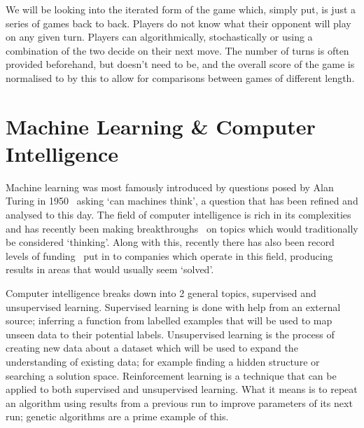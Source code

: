 We will be looking into the iterated form of the game which, simply put, is just a series of games back to back. 
Players do not know what their opponent will play on any given turn.
Players can algorithmically, stochastically or using a combination of the two decide on their next move.
The number of turns is often provided beforehand, but doesn't need to be, and the overall score of the game is normalised to by this to allow for comparisons between games of different length.

\section{Machine Learning \& Computer Intelligence}\label{sec:machineLearningAndcomputerIntelligence}
Machine learning was most famously introduced by questions posed by Alan Turing in 1950~\cite{turing1950computing} asking `can machines think', a question that has been refined and analysed to this day.
The field of computer intelligence is rich in its complexities and has recently been making breakthroughs~\cite{knight2017alphaZeroMIT} on topics which would traditionally be considered `thinking'.
Along with this, recently there has also been record levels of funding~\cite{chui2017artificial} put in to companies which operate in this field, producing results in areas that would usually seem `solved'.

Computer intelligence breaks down into 2 general topics, supervised and unsupervised learning.
Supervised learning is done with help from an external source; inferring a function from labelled examples that will be used to map unseen data to their potential labels.
Unsupervised learning is the process of creating new data about a dataset which will be used to expand the understanding of existing data; for example finding a hidden structure or searching a solution space.
Reinforcement learning is a technique that can be applied to both supervised and unsupervised learning.
What it means is to repeat an algorithm using results from a previous run to improve parameters of its next run; genetic algorithms are a prime example of this.

